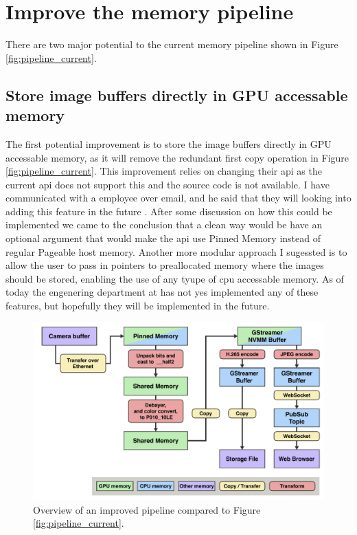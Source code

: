\section{Improve the memory pipeline}
\label{sec:memory_pipeline_improvements}

There are two major potential to the current memory pipeline shown in Figure \ref{fig:pipeline_current}.

\subsection{Store image buffers directly in GPU accessable memory}
The first potential improvement is to store the image buffers directly in GPU accessable memory, as it will remove the redundant first copy operation in Figure \ref{fig:pipeline_current}.
This improvement relies on \lucid changing their \gls{api} as the current \gls{api} does not support this and the source code is not available.
I have communicated with a \lucid employee over email, and he said that they will looking into adding this feature in the future \cite{martensRe17896Use2023}.
After some discussion on how this could be implemented we came to the conclusion that a clean way would be have an optional argument that would make the \gls{api} use Pinned Memory instead of regular Pageable host memory.
Another more modular approach I sugessted is to allow the user to pass in pointers to preallocated memory where the images should be stored, enabling the use of any tyupe of \gls{cpu} accessable memory.
As of today the engenering department at \lucid has not yes implemented any of these features, but hopefully they will be implemented in the future.

\begin{figure}[H]
    \centering
    \includegraphics[width=\textwidth]{figures/memory_pipeline/optimal.pdf}
    \caption{Overview of an improved pipeline compared to Figure \ref{fig:pipeline_current}.}
    \label{fig:pipeline_optimal}
\end{figure}

